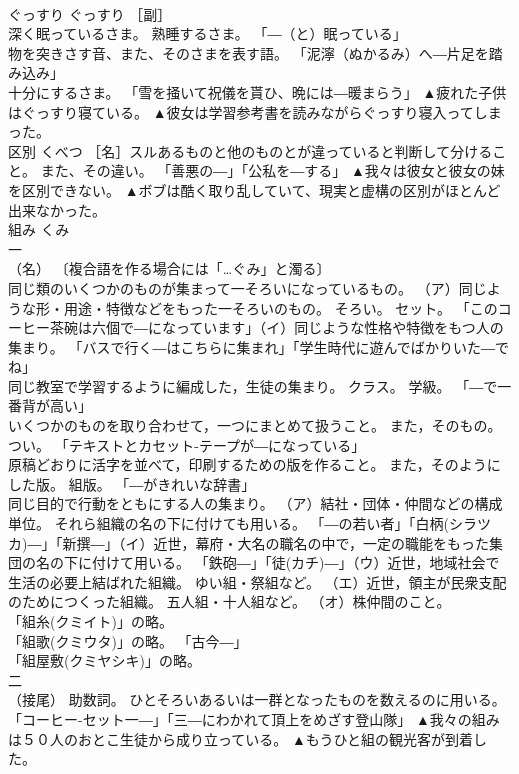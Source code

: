 \documentclass[8pt]{extreport}
\begin{document}
\begin{CJK}{UTF8}{min}
\\	ぐっすり	ぐっすり	［副］ 
\\	深く眠っているさま。 熟睡するさま。 「―（と）眠っている」 
\\	物を突きさす音、また、そのさまを表す語。 「泥濘（ぬかるみ）へ―片足を踏み込み」 
\\	十分にするさま。 「雪を掻いて祝儀を貰ひ、晩には―暖まらう」	▲疲れた子供はぐっすり寝ている。 ▲彼女は学習参考書を読みながらぐっすり寝入ってしまった。
\\	区別	くべつ	［名］スルあるものと他のものとが違っていると判断して分けること。 また、その違い。 「善悪の―」「公私を―する」	▲我々は彼女と彼女の妹を区別できない。 ▲ボブは酷く取り乱していて、現実と虚構の区別がほとんど出来なかった。
\\	組み	くみ	
\\	一
\\	（名） 〔複合語を作る場合には「…ぐみ」と濁る〕 
\\	同じ類のいくつかのものが集まって一そろいになっているもの。 （ア）同じような形・用途・特徴などをもった一そろいのもの。 そろい。 セット。 「このコーヒー茶碗は六個で―になっています」（イ）同じような性格や特徴をもつ人の集まり。 「バスで行く―はこちらに集まれ」「学生時代に遊んでばかりいた―でね」 
\\	同じ教室で学習するように編成した，生徒の集まり。 クラス。 学級。 「―で一番背が高い」 
\\	いくつかのものを取り合わせて，一つにまとめて扱うこと。 また，そのもの。 つい。 「テキストとカセット-テープが―になっている」 
\\	原稿どおりに活字を並べて，印刷するための版を作ること。 また，そのようにした版。 組版。 「―がきれいな辞書」 
\\	同じ目的で行動をともにする人の集まり。 （ア）結社・団体・仲間などの構成単位。 それら組織の名の下に付けても用いる。 「―の若い者」「白柄(シラツカ)―」「新撰―」（イ）近世，幕府・大名の職名の中で，一定の職能をもった集団の名の下に付けて用いる。 「鉄砲―」「徒(カチ)―」（ウ）近世，地域社会で生活の必要上結ばれた組織。 ゆい組・祭組など。 （エ）近世，領主が民衆支配のためにつくった組織。 五人組・十人組など。 （オ）株仲間のこと。 
\\	「組糸(クミイト)」の略。 
\\	「組歌(クミウタ)」の略。 「古今―」 
\\	「組屋敷(クミヤシキ)」の略。 
\\	二
\\	（接尾） 助数詞。 ひとそろいあるいは一群となったものを数えるのに用いる。 「コーヒー-セット一―」「三―にわかれて頂上をめざす登山隊」	▲我々の組みは５０人のおとこ生徒から成り立っている。 ▲もうひと組の観光客が到着した。

\end{CJK}
\end{document}
